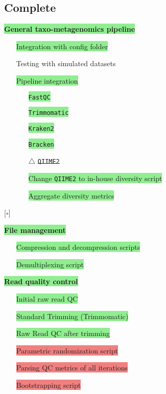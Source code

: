 \documentclass[11pt]{report}
\newcommand{\done}{\checkmark}  %
\newcommand{\pending}{$\square$}  %
\newcommand{\issue}{$\triangle$}  %
\newcommand{\highlightessential}[1]{\colorbox{lightgreen}{#1}}  %
\newcommand{\highlightoptional}[1]{\colorbox{lightorange}{#1}}  %
\newcommand{\highlightrobust}[1]{\colorbox{lightcoral}{#1}}  %
\newcommand{\deprecated}[1]{\sout{#1}}  %
\begin{document}
\begin{multicols}{2}
\section*{Complete} 


\par\noindent\highlightessential{\textbf{\large General taxo-metagenomics pipeline}}
	\begin{itemize}
		\item [\done] \highlightessential{Integration with config folder}
		\item [\done] \highlightoptional{Testing with simulated datasets}
		\item [\done] \highlightessential{Pipeline integration}
			\begin{itemize}
				\item [\done] \highlightessential{\texttt{FastQC}}
				\item [\done] \highlightessential{\texttt{Trimmomatic}}
				\item [\done] \highlightessential{\texttt{Kraken2}}
				\item [\done] \highlightessential{\texttt{Bracken}}
				\item [\issue] \deprecated{\texttt{QIIME2}}
				\item [\done] \highlightessential{Change \texttt{QIIME2} to in-house diversity script}
				\item [\done] \highlightessential{Aggregate diversity metrics}
			\end{itemize}
	\end{itemize}


[\pending] \par\noindent\highlightessential{\textbf{\large File management}}
\begin{itemize}
	\item [\done] \highlightessential{Compression and decompression scripts}
	\item [\done] \highlightessential{Demultiplexing script}

\end{itemize}
\par\noindent\highlightessential{\textbf{\large Read quality control}}
	\begin{itemize}
		\item [\done] \highlightessential{Initial raw read QC}
		\item [\done] \highlightessential{Standard Trimming (Trimmomatic)}
		\item [\done] \highlightessential{Raw Read QC after trimming}
		\item [\done] \highlightrobust{Parametric randomization script}
		\item [\done] \highlightrobust{Parsing QC metrics of all iterations}
		\item [\done] \highlightrobust{Bootstrapping script}


\end{itemize}
\end{multicols}
\end{document}
